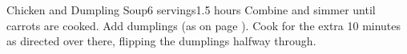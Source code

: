 \documentclass[../Cookbook.tex]{subfiles}
\begin{document}
\begin{recipe}[ChickenAndDumplingSoup]{Chicken and Dumpling Soup}{6 servings}{1.5 hours}
    Combine and simmer until carrots are cooked.
    Add dumplings (as on page \pageref{Dumplings}).
    Cook for the extra 10 minutes as directed over there, flipping the dumplings halfway through.
\end{recipe}
\end{document}
